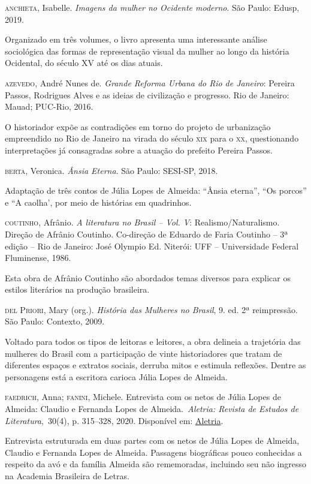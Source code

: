 \documentclass[12pt]{extarticle}
\begin{document}
\textsc{anchieta}, Isabelle. \emph{Imagens da mulher no Ocidente moderno}. São
Paulo: Edusp, 2019. 

Organizado em três volumes, o livro apresenta uma
interessante análise sociológica das formas de representação visual da
mulher ao longo da história Ocidental, do século XV até os dias
atuais.

\textsc{azevedo}, André Nunes de. \emph{Grande Reforma Urbana do Rio de
Janeiro}: Pereira Passos, Rodrigues Alves e as ideias de civilização e
progresso. Rio de Janeiro: Mauad; PUC-Rio, 2016. 

O historiador expõe as contradições em torno do projeto de urbanização empreendido 
no Rio de Janeiro na virada do século \textsc{xix} para o \textsc{xx}, questionando
interpretações já consagradas sobre a atuação do prefeito Pereira
Passos.

\textsc{berta}, Veronica. \textit{Ânsia Eterna}. São Paulo: SESI-SP,
2018.

Adaptação de três contos de Júlia Lopes de Almeida: ``Ânsia eterna'', 
``Os porcos'' e ``A caolha', por meio de histórias em quadrinhos.

\textsc{coutinho}, Afrânio. \textit{A literatura no Brasil -- Vol. V}:
Realismo/Naturalismo. Direção de Afrânio Coutinho. Co-direção de 
Eduardo de Faria Coutinho -- 3ª edição -- Rio de Janeiro: José Olympio
Ed. Niterói: UFF -- Universidade Federal Fluminense, 1986.

Esta obra de Afrânio Coutinho são abordados temas diversos para explicar 
os estilos literários na produção brasileira.

\textsc{del Priori}, Mary (org.). \emph{História das Mulheres no Brasil}, 9.
ed. 2ª reimpressão. São Paulo: Contexto, 2009. 

Voltado para todos os tipos de leitoras e leitores, a obra delineia a trajetória das
mulheres do Brasil com a participação de vinte historiadores que
tratam de diferentes espaços e extratos sociais, derruba mitos e
estimula reflexões. Dentre as personagens está a escritora carioca
Júlia Lopes de Almeida.

\textsc {faedrich}, Anna; \textsc{fanini}, Michele. Entrevista com os netos de Júlia
Lopes de Almeida: Claudio e Fernanda Lopes de Almeida.~\emph{Aletria:
Revista de Estudos de Literatura},~30(4), p. 315--328, 2020.
Disponível em: \href{https://doi.org/10.35699/2317-2096.2020.24495}{Aletria}.

Entrevista estruturada em duas partes com os netos de Júlia Lopes de
Almeida, Claudio e Fernanda Lopes de Almeida. Passagens biográficas
pouco conhecidas a respeito da avó e da família Almeida são
rememoradas, incluindo seu não ingresso na Academia Brasileira de
Letras.
\end{document}
